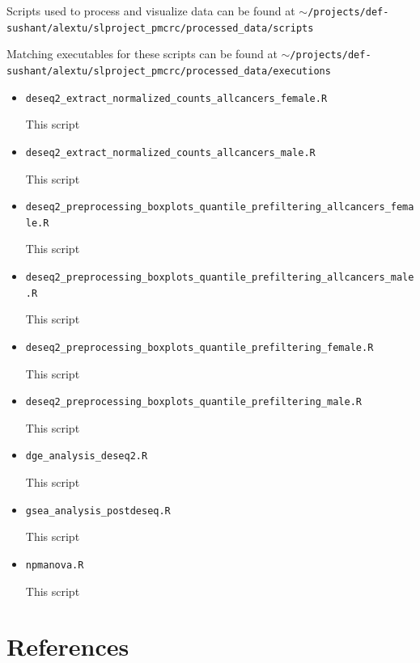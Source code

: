 \documentclass[10pt]{article}
\begin{document}
Scripts used to process and visualize data can be found at \texttt{$\sim$/projects/def-sushant/alextu/\newline slproject\_pmcrc/processed\_data/scripts}

Matching executables for these scripts can be found at
\texttt{$\sim$/projects/def-sushant/alextu/\newline slproject\_pmcrc/processed\_data/executions}

\begin{itemize}
	\item\texttt{deseq2\_extract\_normalized\_counts\_allcancers\_female.R}
	
	This script 
	
	\item\texttt{deseq2\_extract\_normalized\_counts\_allcancers\_male.R}
	
	This script 
	
	\item\texttt{deseq2\_preprocessing\_boxplots\_quantile\_prefiltering\_allcancers\_female.R}
	
	This script 
	
	\item\texttt{deseq2\_preprocessing\_boxplots\_quantile\_prefiltering\_allcancers\_male.R}
	
	This script 
	
	\item\texttt{deseq2\_preprocessing\_boxplots\_quantile\_prefiltering\_female.R}
	
	This script 
	
	\item\texttt{deseq2\_preprocessing\_boxplots\_quantile\_prefiltering\_male.R}
	
	This script 
	
	\item\texttt{dge\_analysis\_deseq2.R}
	
	This script 
	
	\item\texttt{gsea\_analysis\_postdeseq.R}
	
	This script
	
	\item\texttt{npmanova.R}
	
	This script
	
\end{itemize}

\clearpage\newpage
\section{References}
\end{document}
